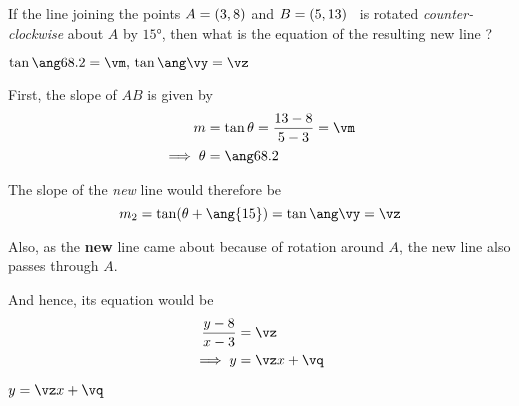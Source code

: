 



\SUBTRACT\vd\vb\ve
\SUBTRACT\vc\va\vf
\EXPR[2]\vm{\ve / \vf}
\ADD{}\vy
\DEGREESTAN\vy\vw
\ROUND[2]\vw\vz

\MULTIPLY\vz{-\va}\vp
\ADD\vp\vb\vq

\question[3] If the line joining the points $A = (3, 8)$ and $B = (5, 13)$ 
\ is rotated \textit{counter-clockwise} about $A$ by $\ang{15}$, then what is the equation 
of the resulting new line ? 

$\tan\ang\vx=\vm,\,\tan\ang\vy=\vz$

\watchout

\begin{solution}[\halfpage]
    First, the slope of $AB$ is given by 
    \begin{align}
        m &= \tan\theta = \dfrac{\vd - \vb}{\vc - \va} = \vm \\
        \implies \theta &= \ang\vx
    \end{align}

    The slope of the \textit{new} line would therefore be 
    \[ m_2 = \tan(\theta + \ang{15}) = \tan\ang\vy = \vz \] 
    
    Also, as the \textbf{new} line came about because of rotation around $A$, the new 
    line also passes through $A$. 
    
    And hence, its equation would be
    \begin{align}
      \dfrac{y-\vb}{x-\va} &= \vz  \\
      \implies y &= \vz x + \vq
    \end{align}
\end{solution}

\ifprintanswers
  \begin{codex}
    $y = \vz x + \vq$
  \end{codex}
\fi
